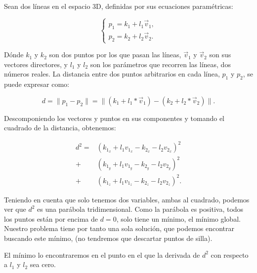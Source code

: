 Sean dos líneas en el espacio 3D, definidas por sus ecuaciones paramétricas:

\begin{equation}
\begin{cases}
p_1 = k_1 + l_1  \vec{v}_1,\\
p_2 = k_2 + l_2  \vec{v}_2.
\end{cases}
\end{equation}

Dónde $k_1$ y $k_2$ son dos puntos por los que pasan las líneas, $\vec{v}_1$ y $\vec{v}_2$ son sus vectores directores, y $l_1$ y $l_2$ son los parámetros que recorren las líneas, dos números reales. La distancia entre dos puntos arbitrarios en cada línea, $p_1$ y $p_2$, se puede expresar como:

\begin{equation}
d = \| p_1 - p_2 \| = \| (k_1 + l_1 * \vec{v}_1) - (k_2 + l_2 * \vec{v}_2) \|.
\end{equation}

Descomponiendo los vectores y puntos en sus componentes y tomando el cuadrado de la distancia, obtenemos:

\begin{equation}
\begin{align}
    d^2 = &\left(k_{1_x} + l_1 v_{1_x} - k_{2_x} - l_2 v_{2_x}\right)^2\\
    + &\left(k_{1_y} + l_1 v_{1_y} - k_{2_y} - l_2 v_{2_y}\right)^2\\
    + &\left(k_{1_z} + l_1 v_{1_z} - k_{2_z} - l_2 v_{2_z}\right)^2.
\end{align}
\end{equation}

Teniendo en cuenta que solo tenemos dos variables, ambas al cuadrado, podemos ver que \(d^2\) es una parábola tridimensional. Como la parábola es positiva, todos los puntos están por encima de $d = 0$, solo tiene un mínimo, el mínimo global. Nuestro problema tiene por tanto una sola solución, que podemos encontrar buscando este mínimo, (no tendremos que descartar puntos de silla).

El mínimo lo encontraremos en el punto en el que la derivada de $d^2$ con respecto a $l_1$ y $l_2$ sea cero.

